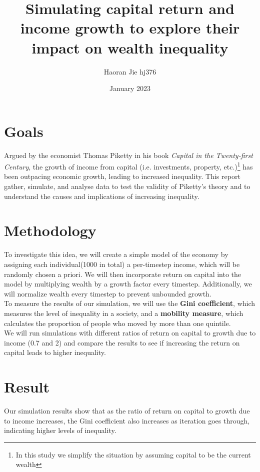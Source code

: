 \documentclass{article}
\title{Simulating capital return and income growth to explore their impact on wealth inequality
}
\author{Haoran Jie hj376}
\date{January 2023}
\begin{document}
\maketitle


\section*{Goals}
Argued by the economist Thomas Piketty in his book \textit{Capital in the Twenty-first Century}, the growth of income from capital (i.e. investments, property, etc.)\footnote{In this study we simplify the situation by assuming capital to be the current wealth} has been outpacing economic growth, leading to increased inequality. This report gather, simulate, and analyse data to test the validity of Piketty's theory and to understand the causes and implications of increasing inequality.

\section*{Methodology}
To investigate this idea, we will create a simple model of the economy by assigning each individual(1000 in total) a per-timestep income, 
which will be randomly chosen a priori. We will then incorporate return on capital into the model by multiplying wealth by a growth factor every timestep.
Additionally, we will normalize wealth every timestep to prevent unbounded growth.\\
To measure the results of our simulation, we will use the \textbf{Gini coefficient}, which measures the level of inequality in a society, 
and a \textbf{mobility measure}, which calculates the proportion of people who moved by more than one quintile.\\
We will run simulations with different ratios of return on capital to growth due to income (0.7 and 2) and compare the results to see if increasing the return on capital leads to higher inequality.






\section*{Result}
Our simulation results show that as the ratio of return on capital to growth due to income increases, 
the Gini coefficient also increases as iteration goes through, indicating higher levels of inequality. 
\end{document}
